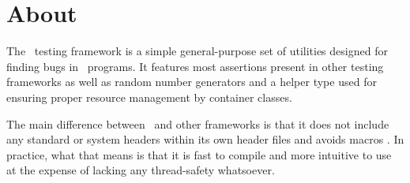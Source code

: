 \section{About}

The \voidtest\ testing framework is a simple general-purpose set of utilities designed for finding
bugs in \cpp\ programs. It features most assertions present in other testing frameworks as well as
random number generators and a helper type used for ensuring proper resource management by
container classes. \par
The main difference between \voidtest\ and other frameworks is that it does not include any standard
or system headers within its own header files and avoids macros . In practice,
what that means is that it is  fast to compile and more intuitive to use at the
expense of lacking any thread-safety whatsoever. \par
